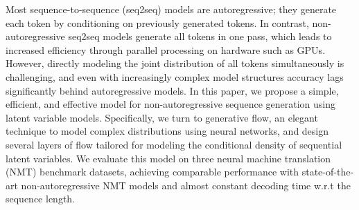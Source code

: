 Most sequence-to-sequence (seq2seq) models are autoregressive; they generate each token by conditioning on previously generated tokens.
In contrast, non-autoregressive seq2seq models generate all tokens in one pass, which leads to increased efficiency through parallel processing on hardware such as GPUs. 
However, directly modeling the joint distribution of all tokens simultaneously is challenging, and even with increasingly complex model structures accuracy lags significantly behind autoregressive models.
In this paper, we propose a simple, efficient, and effective model for non-autoregressive sequence generation using latent variable models.
Specifically, we turn to generative flow, an elegant technique to model complex distributions using neural networks, and design several layers of flow tailored for modeling the conditional density of sequential latent variables.
We evaluate this model on three neural machine translation (NMT) benchmark datasets, achieving comparable performance with state-of-the-art non-autoregressive NMT models and almost constant decoding time w.r.t the sequence length.